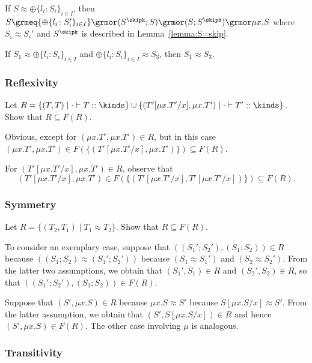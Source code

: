 \begin{lemma}\label{lemma:S=oplus}
  If $S \approx {\oplus\{l_i\colon S_i\}_{i\in I}}$, then $S \grmeq {\oplus\{l_i\colon S_i'\}_{i\in I}} \grmor (S^{\skipk};
  S)\grmor (S; S^{\skipk}) \grmor \mu x.S$ where $S_i \approx S_i'$ and  $S^{\skipk}$ is
  described in Lemma~\ref{lemma:S=skip}.
\end{lemma}

\begin{lemma}
  If $S_1 \approx {\oplus\{l_i\colon S_i\}_{i\in I}}$ and
  ${\oplus\{l_i\colon S_i\}_{i\in I}} \approx S_3$, then $S_1 \approx
  S_3$.
\end{lemma}

\subsubsection{Reflexivity}
\label{sec:reflexivity}

Let $R = \{ (T, T) \mid \cdot \vdash T :: \kinds \} \cup \{(T'[\mu
x.T' / x], \mu x.T') \mid \cdot \vdash T' :: \kinds \}$. Show that $R \subseteq F(R)$.

Obvious, except for $(\mu x.T', \mu x.T') \in R$, but in this case
$(\mu x.T', \mu x.T') \in F (\{(T'[\mu x.T' / x], \mu x.T')\}) \subseteq F (R)$.

For $(T'[\mu x.T' / x], \mu x.T') \in R$, observe that
$$(T'[\mu x.T' / x], \mu x.T') \in F (\{(T'[\mu x.T' / x], T'[\mu x.T'/x])\}) \subseteq F (R).$$

\subsubsection{Symmetry}
\label{sec:symmetry}

Let $R = \{ (T_2, T_1) \mid T_1 \approx T_2 \}$. Show that $R \subseteq F(R)$.

To consider an exemplary case,
suppose that $((S_1'; S_2'), (S_1; S_2)) \in R$ because $((S_1; S_2) \approx (S_1'; S_2'))$ because
$(S_1 \approx S_1')$ and $(S_2 \approx S_2')$. From the latter two assumptions, we obtain that
$(S_1', S_1) \in R$ and $(S_2', S_2) \in R$, so that $((S_1'; S_2'), (S_1; S_2)) \in F(R)$.

Suppose that $(S', \mu x.S) \in R$ because $\mu x.S \approx S'$ because $S[\mu x.S/x] \approx
S'$. From the latter assumption, we obtain that $(S', S[\mu x.S/x]) \in R$ and hence $(S', \mu x.S)
\in F (R)$. The other case involving $\mu$ is analogous.

\subsubsection{Transitivity}
\label{sec:transitivity}

